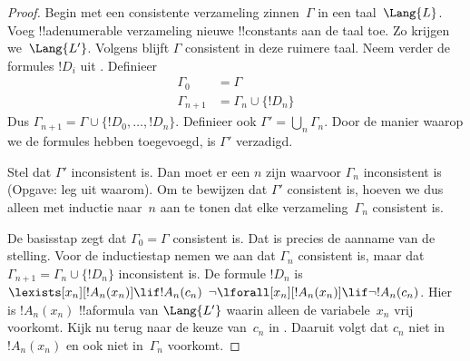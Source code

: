 \documentclass[openany]{memoir}
\begin{document}
\begin{proof}
Begin met een consistente verzameling zinnen~$\Gamma$ in een
taal~$\Lang{L}$. Voeg !!a{denumerable} verzameling nieuwe !!{constant}s
aan de taal toe. Zo krijgen we~$\Lang{L'}$. Volgens
 blijft $\Gamma$ consistent in deze ruimere taal.
Neem verder de formules $!D_i$ uit . Definieer
\begin{align*}
\Gamma_0 & = \Gamma \\
\Gamma_{n+1} & = \Gamma_n \cup \{!D_n \}
\end{align*}
Dus $\Gamma_{n+1} = \Gamma \cup \{ !D_0, \dots, !D_n \}$. Definieer
ook $\Gamma' = \bigcup_{n} \Gamma_n$. Door de manier waarop we de
formules hebben toegevoegd, is $\Gamma'$ verzadigd.

Stel dat $\Gamma'$ inconsistent is. Dan moet er een $n$ zijn waarvoor
$\Gamma_n$ inconsistent is (Opgave: leg uit waarom). Om te bewijzen dat
$\Gamma'$ consistent is, hoeven we dus alleen met inductie naar~$n$ aan
te tonen dat elke verzameling~$\Gamma_n$ consistent is.

De basisstap zegt dat $\Gamma_0 = \Gamma$ consistent is. Dat is precies
de aanname van de stelling. Voor de inductiestap nemen we aan dat
$\Gamma_{n}$ consistent is, maar dat $\Gamma_{n+1} =
\Gamma_n \cup \{!D_n\}$ inconsistent is. De formule $!D_n$ is
{$\lexists[x_{n}][!A_{n}(x_n)] \lif !A_{n}(c_{n})$}
{$\lnot\lforall[x_{n}][!A_{n}(x_n)] \lif \lnot !A_{n}(c_{n})$}.
Hier is $!A_n(x_n)$ !!a{formula} van $\Lang{L'}$ waarin alleen de
variabele~$x_n$ vrij voorkomt. Kijk nu terug naar de keuze van~$c_n$ in
. Daaruit volgt dat $c_n$ niet in~$!A_n(x_n)$ en
ook niet in~$\Gamma_n$ voorkomt.


\end{proof}
\end{document}
